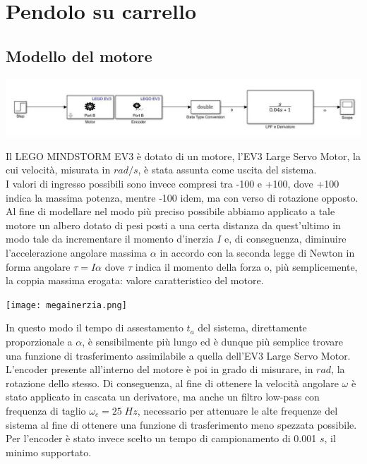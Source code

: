 \chapter{Pendolo su carrello}
\section{Modello del motore}
\begin{center}
	\includegraphics[width=\textwidth]{motoreSimulink.jpg}
\end{center}
Il LEGO MINDSTORM EV3 è dotato di un motore, l'EV3 Large Servo Motor, la cui velocità, misurata in $rad/s$, è stata assunta come uscita del sistema.\\
I valori di ingresso possibili sono invece compresi tra -100 e +100, dove +100 indica la massima potenza, mentre -100 idem, ma con verso di rotazione opposto.\\
Al fine di modellare nel modo più preciso possibile abbiamo applicato a tale motore un albero dotato di pesi posti a una certa distanza da quest'ultimo in modo tale da incrementare il momento d'inerzia $I$ e, di conseguenza, diminuire l'accelerazione angolare massima $\alpha$ in accordo con la seconda legge di Newton in forma angolare $\tau = I\alpha$ dove $\tau$ indica il momento della forza o, più semplicemente, la coppia massima erogata: valore caratteristico del motore.
\begin{center}
	\texttt{[image: megainerzia.png]}
\end{center}
In questo modo il tempo di assestamento $t_a$ del sistema, direttamente proporzionale a $\alpha$, è sensibilmente più lungo ed è dunque più semplice trovare una funzione di trasferimento assimilabile a quella dell'EV3 Large Servo Motor.\\
L'encoder presente all'interno del motore è poi in grado di misurare, in $rad$, la rotazione dello stesso.
Di conseguenza, al fine di ottenere la velocità angolare $\omega$ è stato applicato in cascata un derivatore, ma anche un filtro low-pass con frequenza di taglio $\omega_c=25\;Hz$, necessario per attenuare le alte frequenze del sistema al fine di ottenere una funzione di trasferimento meno spezzata possibile.\\
Per l'encoder è stato invece scelto un tempo di campionamento di 0.001 $s$, il minimo supportato.\\
